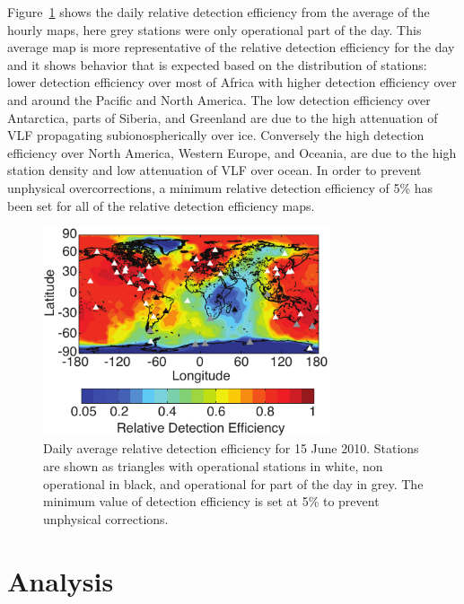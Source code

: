 Figure~\ref{efficiency:fig:Daily_Map} shows the daily relative detection efficiency from the average of the hourly maps, here grey stations were only operational part of the day.
This average map is more representative of the relative detection efficiency for the day and it shows behavior that is expected based on the distribution of stations: lower detection efficiency over most of Africa with higher detection efficiency over and around the Pacific and North America.
The low detection efficiency over Antarctica, parts of Siberia, and Greenland are due to the high attenuation of VLF propagating subionospherically over ice.
Conversely the high detection efficiency over North America, Western Europe, and Oceania, are due to the high station density and low attenuation of VLF over ocean.
In order to prevent unphysical overcorrections, a minimum relative detection efficiency of 5\% has been set for all of the relative detection efficiency maps.

\begin{figure}[ht!]
   \centering
\noindent\includegraphics[width=20pc]{efficiency/Figures/2012RS005049-p7.pdf}
   \caption{Daily average relative detection efficiency for 15 June 2010.
Stations are shown as triangles with operational stations in white, non operational in black, and operational for part of the day in grey.
The minimum value of detection efficiency is set at 5\% to prevent unphysical corrections.}
   \label{efficiency:fig:Daily_Map}
\end{figure}

\section{Analysis}

